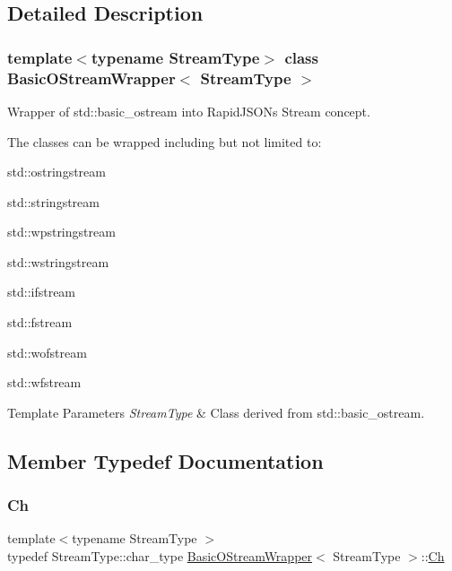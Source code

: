 \subsection{Detailed Description}
\subsubsection*{template$<$typename Stream\+Type$>$\newline
class Basic\+O\+Stream\+Wrapper$<$ Stream\+Type $>$}

Wrapper of {\ttfamily std\+::basic\+\_\+ostream} into Rapid\+J\+S\+ON\textquotesingle{}s Stream concept. 

The classes can be wrapped including but not limited to\+:


\begin{DoxyItemize}
\item {\ttfamily std\+::ostringstream} 
\item {\ttfamily std\+::stringstream} 
\item {\ttfamily std\+::wpstringstream} 
\item {\ttfamily std\+::wstringstream} 
\item {\ttfamily std\+::ifstream} 
\item {\ttfamily std\+::fstream} 
\item {\ttfamily std\+::wofstream} 
\item {\ttfamily std\+::wfstream} 
\end{DoxyItemize}


\begin{DoxyTemplParams}{Template Parameters}
{\em Stream\+Type} & Class derived from {\ttfamily std\+::basic\+\_\+ostream}. \\
\hline
\end{DoxyTemplParams}


\subsection{Member Typedef Documentation}
\mbox{\label{classBasicOStreamWrapper_aafc6276f1f5cc0b8d45d137584d380bb}} 
\subsubsection{\texorpdfstring{Ch}{Ch}}
{\footnotesize\ttfamily template$<$typename Stream\+Type $>$ \\
typedef Stream\+Type\+::char\+\_\+type \hyperlink{classBasicOStreamWrapper}{Basic\+O\+Stream\+Wrapper}$<$ Stream\+Type $>$\+::\hyperlink{classBasicOStreamWrapper_aafc6276f1f5cc0b8d45d137584d380bb}{Ch}}



